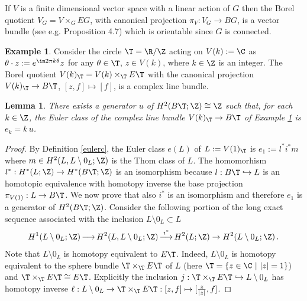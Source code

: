 \documentclass[11pt,a4paper,reqno]{article}
\DeclareMathOperator*{\toup}{\longrightarrow}
\numberwithin{equation}{section}
\newtheorem{lemma}[theorem]{Lemma}
\theoremstyle{definition}
\newtheorem{example}[theorem]{Example}
\begin{document}
If $V$ is a finite dimensional 
vector space with a linear action of $G$ then the Borel quotient $V_G = V \times_G EG$, with canonical projection 
$ \pi_V :  V_G \to BG $, is a vector bundle (see e.g. \cite{Tu} Proposition 4.7) which is orientable  since $ G $ is connected.

\begin{example}\label{ex1c}
Consider the circle $\T=\R/\Z$ acting on $V(k):=\C$ as
$  \theta\cdot z:=e^{ \im 2\pi k\theta }z $  for any  $ \theta\in \T $, $ z\in V(k) $, 
where $k\in\Z$ is an integer. 
The Borel quotient 
$ V(k)_\T=V(k)\times_{\T} E\T $ with the canonical projection $V(k)_\T\to B\T$, $[z,f]\mapsto [f]$,  is a complex line bundle. 

\begin{lemma}\label{l:e_k}
There exists a generator $u$ of $H^2(B\T;\Z)\cong\Z$ such that, for each $k\in\Z$, the Euler class of the complex line bundle $V(k)_\T\to B\T$ of Example \ref{ex1c} is 
$ e_k=k\,u $. 
\end{lemma}

\begin{proof} 
By Definition \ref{eulerc}, 
the Euler class $ e(L) $
of $ L :=V(1)_\T $ is 
$ e_1:=l^*i^*m $ 
where 
$ m \in H^2(L,L\setminus0_L;\Z)$ is the Thom class of $ L $.
The homomorhism 
$ l^* : H^* (L;\Z) \to H^* (B\T;\Z) $ is an isomorphism because  $l:B\T\hookrightarrow L$ is an homotopic equivalence  
with homotopy inverse the base projection $ \pi_{V(1)} :L\to B\T$.
We now prove that  also 
$ i^* $ is an  isomorphism 
and therefore $e_1$ is a generator of $H^2(B\T;\Z)$.
Consider the following portion of the long exact sequence associated with the inclusion $L\setminus0_L\subset L $ 
\begin{equation}\label{pezzom}
H^{1}(L\setminus0_L;\Z)\toup H^2(L,L\setminus 0_L;\Z)\toup^{i^*} H^2(L;\Z)\to H^2(L\setminus0_L;\Z) \, . 
\end{equation}
Note that $L\setminus 0_L$ is homotopy equivalent to $E\T $. 
Indeed, 
$L\setminus 0_L$ is homotopy equivalent to the 
sphere bundle  
$\T\times_\T E\T$ of $L$ (here $ \T = \{ z \in \C 
\ | \ | z | = 1 \}$) 
and 
$\T\times_\T E\T\cong E\T$.  
Explicitly the inclusion $j:\T\times_\T E\T\hookrightarrow L\setminus 0_L$ has homotopy inverse $\ell:L\setminus 0_L\to \T\times_\T E\T:[z,f]\mapsto [\tfrac{z}{|z|},f]$.


\end{proof}
\end{example}
\end{document}
